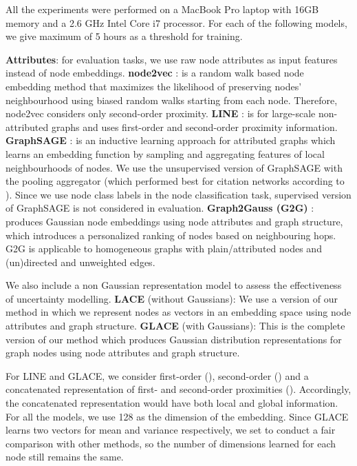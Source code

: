 \documentclass[runningheads]{llncs}
\begin{document}
All the experiments were performed on a MacBook Pro laptop with 16GB memory and a 2.6 GHz Intel Core i7 processor. For each of the following models, we give maximum of 5 hours as a threshold for training.

\textbf{Attributes}: for evaluation tasks, we use raw node attributes as input features instead of node embeddings.
\textbf{node2vec} \cite{DBLP:node2vec}: is a random walk based node embedding method that maximizes the likelihood of preserving nodes' neighbourhood using biased random walks starting from each node. Therefore, node2vec considers only second-order proximity.
\textbf{LINE} \cite{DBLP:line}: is for large-scale non-attributed graphs and uses first-order and second-order proximity information.
\textbf{GraphSAGE} \cite{DBLP:graphsage}: is an inductive learning approach for attributed graphs which learns an embedding function by sampling and aggregating features of local neighbourhoods of nodes. We use the unsupervised version of GraphSAGE with the pooling aggregator (which performed best for citation networks according to \cite{DBLP:graphsage}). Since we use node class labels in the node classification task, supervised version of GraphSAGE is not considered in evaluation.
\textbf{Graph2Gauss (G2G)} \cite{g2g}: produces Gaussian node embeddings using node attributes and graph structure, which introduces a personalized ranking of nodes based on neighbouring hops. G2G is applicable to homogeneous graphs with plain/attributed nodes and (un)directed and unweighted edges.

We also include a non Gaussian representation model to assess the effectiveness of uncertainty modelling.
\textbf{LACE} (without Gaussians): We use a version of our method in which we represent nodes as vectors in an embedding space using node attributes and graph structure. 
\textbf{GLACE} (with Gaussians): This is the complete version of our method which produces Gaussian distribution representations for graph nodes using node attributes and graph structure.

For LINE and GLACE, we consider first-order (), second-order () and a concatenated representation of first- and second-order proximities ().
Accordingly, the concatenated representation would have both local and global information.
For all the models, we use 128 as the dimension of the embedding.
Since GLACE learns two vectors for mean and variance respectively, we set  to conduct a fair comparison with other methods, so the number of dimensions learned for each node still remains the same.
\end{document}
